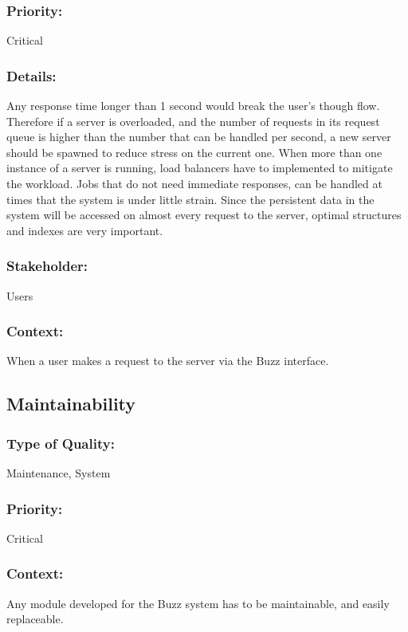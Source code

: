 \documentclass[11pt]{article}
\begin{document}
		\subsubsection{Priority:}
			\textbf{}Critical
		
		\subsubsection{Details:}
			\textbf{}Any response time longer than 1 second would break the user's though flow. Therefore if a server is overloaded, and the number of requests in its request queue is higher than the number that can be handled per second, a new server should be spawned to reduce stress on the current one. When more than one instance of a server is running, load balancers have to implemented to mitigate the workload. Jobs that do not need immediate responses, can be handled at times that the system is under little strain. Since the persistent data in the system will be accessed on almost every request to the server, optimal structures and indexes are very important.
		
		\subsubsection{Stakeholder:}
			\textbf{}Users

		\subsubsection{Context:}
			\textbf{}When a user makes a request to the server via the Buzz interface.
	\subsection{Maintainability}
		\subsubsection{Type of Quality:}
			\textbf{}Maintenance, System
		
		\subsubsection{Priority:}
			\textbf{}Critical

		\subsubsection{Context:}
			\textbf{}Any module developed for the Buzz system has to be maintainable, and easily replaceable.
		
\end{document}
